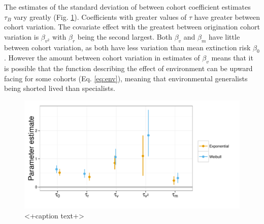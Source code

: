 \documentclass[12pt,letterpaper]{article}
\begin{document}
The estimates of the standard deviation of between cohort coefficient estimates \(\tau_{B}\) vary greatly (Fig. \ref{fig:tau}). Coefficients with greater values of \(\tau\) have greater between cohort variation. The covariate effect with the greatest between origination cohort variation is \(\beta_{v^{2}}\) with \(\beta_{r}\) being the second largest. Both \(\beta_{v}\) and \(\beta_{m}\) have little between cohort variation, as both have less variation than mean extinction risk \(\beta_{0}\). However the amount between cohort variation in estimates of \(\beta_{v}\) means that it is possible that the function describing the effect of environment can be upward facing for some cohorts (Eq. \ref{eq:env}), meaning that environmental generalists being shorted lived than specialists.
\begin{figure}[ht]
  \centering
  \includegraphics[height = 0.5\textheight,width=\textwidth,keepaspectratio=true]{figure/coef_var}
  \caption{<+caption text+>}
  \label{fig:tau}
\end{figure}
\end{document}
